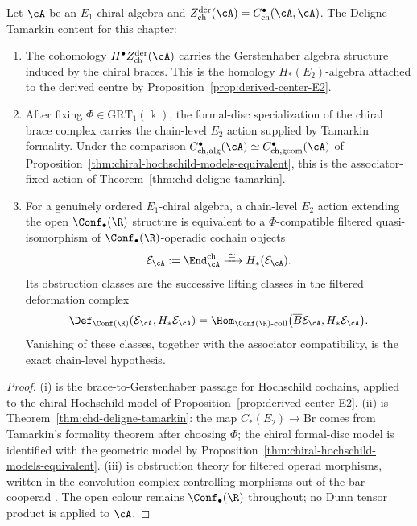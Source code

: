 \begin{theorem}%
\label{thm:chiral-deligne-tamarkin-comparison}%
%
%
Let $\cA$ be an $E_1$-chiral algebra and
$Z^{\mathrm{der}}_{\mathrm{ch}}(\cA)=C^\bullet_{\mathrm{ch}}(\cA,\cA)$.
The Deligne--Tamarkin content for this chapter:
\begin{enumerate}
 \item[\textup{(i)}] The cohomology
 $H^\bullet Z^{\mathrm{der}}_{\mathrm{ch}}(\cA)$ carries the
 Gerstenhaber algebra structure induced by the chiral braces. This is
 the homology $H_\ast(E_2)$-algebra attached to the derived centre by
 Proposition~\ref{prop:derived-center-E2}.
 \item[\textup{(ii)}] After fixing
 $\Phi\in\mathrm{GRT}_1(\Bbbk)$, the formal-disc specialization of
 the chiral brace complex carries the chain-level $E_2$ action
 supplied by Tamarkin formality. Under the comparison
 $C^\bullet_{\mathrm{ch,alg}}(\cA)\simeq
 C^\bullet_{\mathrm{ch,geom}}(\cA)$ of
 Proposition~\ref{thm:chiral-hochschild-models-equivalent}, this is
 the associator-fixed action of
 Theorem~\ref{thm:chd-deligne-tamarkin}.
 \item[\textup{(iii)}] For a genuinely ordered $E_1$-chiral algebra,
 a chain-level $E_2$ action extending the open
 $\Conf_\bullet(\R)$ structure is equivalent to a
 $\Phi$-compatible filtered quasi-isomorphism of
 $\Conf_\bullet(\R)$-operadic cochain objects
 \[
 \mathcal E_\cA:=\End^{\mathrm{ch}}_\cA
 \xrightarrow{\;\simeq\;}H_\ast(\mathcal E_\cA).
 \]
 Its obstruction classes are the successive lifting classes in the
 filtered deformation complex
 \[
 \Def_{\Conf(\R)}(\mathcal E_\cA,H_\ast\mathcal E_\cA)
 =
 \Hom_{\Conf(\R)\text{-}\mathrm{coll}}
 \bigl(\overline{B}\mathcal E_\cA,H_\ast\mathcal E_\cA\bigr).
 \]
 Vanishing of these classes, together with the associator
 compatibility, is the exact chain-level hypothesis.
\end{enumerate}
\end{theorem}

\begin{proof}
(i) is the brace-to-Gerstenhaber passage for Hochschild
cochains, applied to the chiral Hochschild model of
Proposition~\ref{prop:derived-center-E2}. (ii) is
Theorem~\ref{thm:chd-deligne-tamarkin}: the map
$C_\ast(E_2)\to\mathrm{Br}$ comes from Tamarkin's formality
theorem after choosing $\Phi$; the chiral formal-disc model is
identified with the geometric model by
Proposition~\ref{thm:chiral-hochschild-models-equivalent}. (iii)
is obstruction theory for filtered operad morphisms, written
in the convolution complex controlling morphisms out of the bar
cooperad \cite[Chs.~6, 10]{LV12}. The open colour remains
$\Conf_\bullet(\R)$ throughout; no Dunn tensor product is applied to
$\cA$.
\end{proof}

